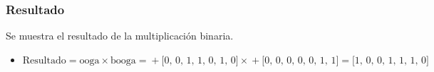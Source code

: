 \documentclass{beamer}
\begin{document}
\begin{frame}
\frametitle{Resultado}
Se muestra el resultado de la multiplicación binaria.
\begin{itemize}
\item $\text{Resultado}=\text{ooga}\times\text{booga}=\text{}+\text{[0, 0, 1, 1, 0, 1, 0]}\times\text{}+\text{[0, 0, 0, 0, 0, 1, 1]}=\text{[1, 0, 0, 1, 1, 1, 0]}$
\end{itemize}
\end{frame}

\begin{frame}
\maketitle
{}
\end{frame}
\end{document}
